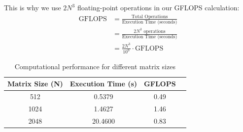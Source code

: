 \documentclass{article}
\begin{document}
This is why we use $2N^3$ floating-point operations in our GFLOPS calculation:
\begin{align*}
    \text{GFLOPS} &= \frac{\text{Total Operations}}{\text{Execution Time (seconds)}} \\
    &= \frac{2N^3 \text{ operations}}{\text{Execution Time (seconds)}} \\
    &= \frac{2N^3}{10^9} \cdot \text{GFLOPS}
\end{align*}

\begin{table}[htbp]
    \centering
    \begin{tabular}{|c|c|c|c|}
        \hline
        \textbf{Matrix Size (N)} & \textbf{Execution Time (s)} & \textbf{GFLOPS} \\
        \hline
        512 & 0.5379 & 0.49 \\
        \hline
        1024 & 1.4627 & 1.46 \\
        \hline
        2048 & 20.4600 & 0.83 \\
        \hline
    \end{tabular}
    \caption{Computational performance for different matrix sizes}
\end{table}
\end{document}
